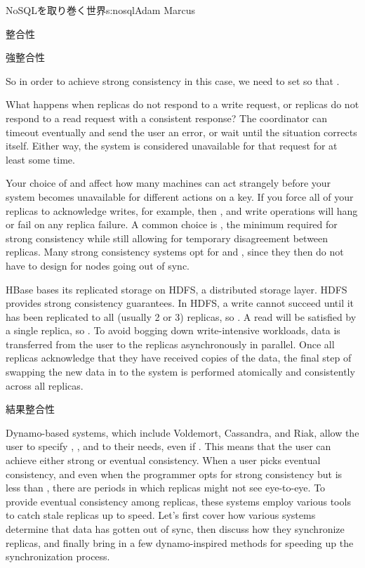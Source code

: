 \begin{aosachapter}{NoSQLを取り巻く世界}{s:nosql}{Adam Marcus}
\begin{aosasect1}{整合性}
\begin{aosasect2}{強整合性}
\begin{aosaitemize}
\end{aosaitemize}

So in order to achieve strong consistency in this case, we need to set
 so that .

What happens when  replicas do not respond to a write request,
or  replicas do not respond to a read request with a
consistent response?  The coordinator can timeout eventually and send
the user an error, or wait until the situation corrects itself.
Either way, the system is considered unavailable for that request for
at least some time.

Your choice of  and  affect how many machines can act
strangely before your system becomes unavailable for different actions
on a key.  If you force all of your replicas to acknowledge writes,
for example, then , and write operations will hang or fail
on any replica failure.  A common choice is ,
the minimum required for strong consistency while still allowing for
temporary disagreement between replicas.  Many strong consistency
systems opt for  and , since they then do not have
to design for nodes going out of sync.

HBase bases its replicated storage on HDFS, a distributed storage layer.  HDFS provides strong consistency
guarantees.  In HDFS, a write cannot succeed until it has been
replicated to all  (usually 2 or 3) replicas, so .
A read will be satisfied by a single replica, so .  To
avoid bogging down write-intensive workloads, data is transferred from
the user to the replicas asynchronously in parallel.  Once all
replicas acknowledge that they have received copies of the data, the
final step of swapping the new data in to the system is performed
atomically and consistently across all replicas.

\end{aosasect2}

\begin{aosasect2}{結果整合性}

Dynamo-based systems, which include Voldemort, Cassandra, and Riak,
allow the user to specify , , and  to their
needs, even if .  This means that the user
can achieve either strong or eventual consistency.  When a user picks
eventual consistency, and even when the programmer opts for strong
consistency but  is less than , there are periods in
which replicas might not see eye-to-eye.  To provide eventual
consistency among replicas, these systems employ various tools to
catch stale replicas up to speed.  Let's first cover how various
systems determine that data has gotten out of sync, then discuss how
they synchronize replicas, and finally bring in a few dynamo-inspired
methods for speeding up the synchronization process.


\end{aosasect2}
\end{aosasect1}
\end{aosachapter}
